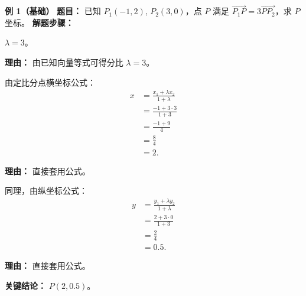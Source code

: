 \begin{examplebox}
	\textbf{\textcolor{CExample}{例 1（基础）}}
	\textbf{\textcolor{CExample}{题目：}}
	已知 $P_1(-1,2)$, $P_2(3,0)$，点 $P$ 满足 $\overrightarrow{P_1P}=3\overrightarrow{PP_2}$，求 $P$ 坐标。
	\textbf{\textcolor{CExample}{解题步骤：}}
	\begin{description}[style=nextline, leftmargin=2.8em, labelsep=0.5em, itemsep=0.45em]
		\item[\textbf{第一步（识别参数）：}]
			$\lambda=3$。
			\par\textbf{理由：} 由已知向量等式可得分比 $\lambda=3$。
		\item[\textbf{第二步（代入横坐标）：}]
			由定比分点横坐标公式：
			\[
				\begin{aligned}
					x &= \frac{x_1+\lambda x_2}{1+\lambda} \\ &= \frac{-1+3\cdot 3}{1+3} \\ &= \frac{-1+9}{4} \\ &= \frac{8}{4} \\ &= 2.
			\end{aligned}
			\]
			\par\textbf{理由：} 直接套用公式。
		\item[\textbf{第三步（代入纵坐标）：}]
			同理，由纵坐标公式：
			\[
				\begin{aligned}
					y &= \frac{y_1+\lambda y_2}{1+\lambda} \\ &= \frac{2+3\cdot 0}{1+3} \\ &= \frac{2}{4} \\ &= 0.5.
			\end{aligned}
			\]
			\par\textbf{理由：} 直接套用公式。
	\end{description}
	\textbf{\textcolor{CExample}{关键结论：}}
	\textbf{$P(2,0.5)$}。


\end{examplebox}
